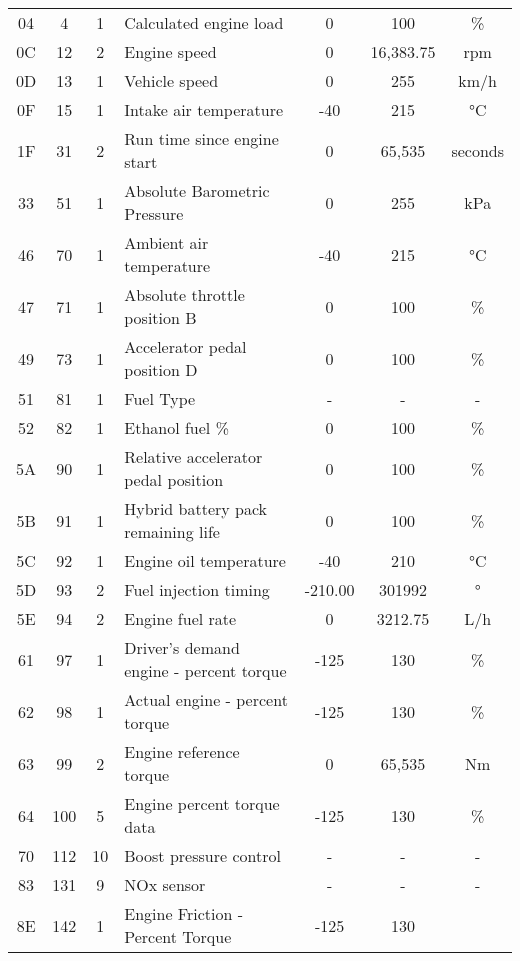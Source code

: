 \begin{table}[h]
\begin{adjustbox}{width=\textwidth}
\begin{tabular}{ccc p{6cm} ccc}
            04 & 4 & 1           & Calculated engine load                      & 0 & 100 & \% \\
            0C & 12 & 2           & Engine speed & 0 & 16,383.75 & rpm \\
            0D & 13 & 1           & Vehicle speed & 0 & 255 & km/h \\
            0F & 15 & 1           & Intake air temperature                      & -40 & 215 & °C \\
            1F & 31 & 2           & Run time since engine start                 & 0 & 65,535 & seconds \\
            33 & 51 & 1           & Absolute Barometric Pressure                & 0 & 255 & kPa \\
            46 & 70 & 1           & Ambient air temperature                     & -40 & 215 & °C \\
            47 & 71 & 1           & Absolute throttle position B                & 0 & 100 & \% \\
            49 & 73 & 1           & Accelerator pedal position D                & 0 & 100 & \% \\
            51 & 81 & 1           & Fuel Type & - & - & - \\
            52 & 82 & 1           & Ethanol fuel \% & 0 & 100 & \% \\
            5A & 90 & 1           & Relative accelerator pedal position         & 0 & 100 & \% \\
            5B & 91 & 1           & Hybrid battery pack remaining life          & 0 & 100 & \% \\
            5C & 92 & 1           & Engine oil temperature                      & -40 & 210 & °C \\
            5D & 93 & 2           & Fuel injection timing & -210.00 & 301992 & ° \\
            5E & 94 & 2           & Engine fuel rate & 0 & 3212.75 & L/h \\
            61 & 97 & 1           & Driver's demand engine - percent torque     & -125 & 130 & \% \\
            62 & 98 & 1           & Actual engine - percent torque              & -125 & 130 & \% \\
            63 & 99 & 2           & Engine reference torque                     & 0 & 65,535 & Nm \\
            64 & 100 & 5           & Engine percent torque data                  & -125 & 130 & \% \\
            70 & 112 & 10          & Boost pressure control                      & - & - & - \\
            83 & 131 & 9           & NOx sensor & - & - & - \\
            8E & 142 & 1           & Engine Friction - Percent Torque            & -125 & 130 & \
        \end{tabular}
    \end{adjustbox}
\end{table}

